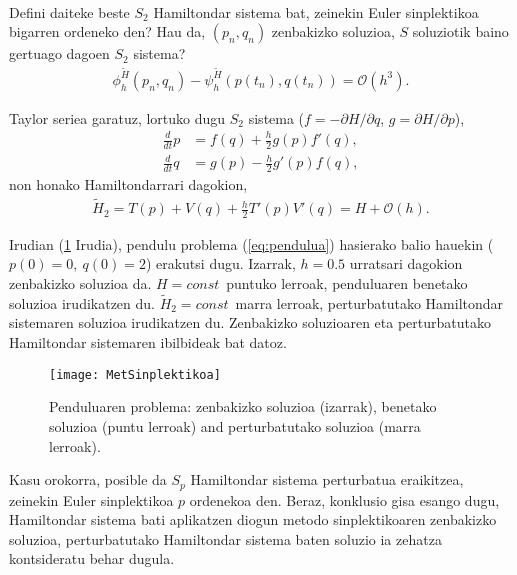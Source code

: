 \paragraph*{}Defini daiteke beste $S_2$ Hamiltondar sistema bat, zeinekin Euler sinplektikoa bigarren ordeneko den? Hau da, $(p_n,q_n)$ zenbakizko soluzioa, $S$ soluziotik baino gertuago dagoen $S_2$ sistema? 
\begin{align*}
\phi_h^{\widetilde{H}}(p_n,q_n)-\psi_h^{\widetilde{H}}(p(t_n),q(t_n))= \mathcal{O}(h^3).
\end{align*}

Taylor seriea garatuz, lortuko dugu $S_2$ sistema  ($f=-\partial H/\partial q$, $g=\partial H/\partial p$),
\begin{align*}
\frac{d}{dt} p &= f(q)+ \frac{h}{2} g(p) f'(q),\\
\frac{d}{dt} q &= g(p)- \frac{h}{2} g'(p) f(q),
\end{align*} 
non honako Hamiltondarrari dagokion,
\begin{align*}
\widetilde{H}_2=T(p)+V(q)+\frac{h}{2} T'(p) V'(q) = H+\mathcal{O}(h).
\end{align*}

Irudian (\ref{fig:MetSinplektikoa} Irudia), pendulu problema (\ref{eq:pendulua}) hasierako balio hauekin ($p(0)=0, \ q(0)=2$) erakutsi dugu. Izarrak, $h=0.5$ urratsari dagokion zenbakizko soluzioa da. $H=const$~puntuko lerroak, penduluaren benetako soluzioa irudikatzen du.  $\widetilde{H}_2=const$~marra lerroak, perturbatutako Hamiltondar sistemaren soluzioa irudikatzen du. Zenbakizko soluzioaren eta perturbatutako Hamiltondar sistemaren ibilbideak bat datoz. 

\begin{figure}[h!]
\centering
\texttt{[image: MetSinplektikoa]}
\caption{ \small Penduluaren problema: zenbakizko soluzioa (izarrak), benetako soluzioa (puntu lerroak) and perturbatutako soluzioa (marra lerroak).}
\label{fig:MetSinplektikoa}
\end{figure}

Kasu orokorra, posible da $S_p$ Hamiltondar sistema perturbatua eraikitzea, zeinekin Euler sinplektikoa $p$ ordenekoa den. Beraz, konklusio gisa esango dugu, Hamiltondar sistema bati aplikatzen diogun metodo sinplektikoaren zenbakizko soluzioa, perturbatutako Hamiltondar sistema baten soluzio ia zehatza kontsideratu behar dugula. 


